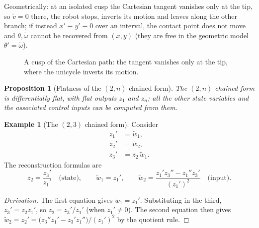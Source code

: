 \documentclass[11pt,a4paper]{article}
\newcommand{\vt}{\tilde v}
\newcommand{\wt}{\tilde\omega}
\newcommand{\wwt}{\tilde w}
\theoremstyle{definition}
\newtheorem{example}[definition]{Example}
\theoremstyle{plain}
\newtheorem{proposition}[definition]{Proposition}
\theoremstyle{remark}
\begin{document}
Geometrically: at an isolated cusp the Cartesian tangent vanishes only at the tip, so $\vt=0$ there, the robot stops, inverts its
motion and leaves along the other branch; if instead $x'\equiv y'\equiv0$ over an interval, the contact point does not move and
$\theta,\wt$ cannot be recovered from $(x,y)$ (they are free in the geometric model $\theta'=\wt$).

\begin{figure}[H]
\centering
{}
\caption{A cusp of the Cartesian path: the tangent vanishes only at the tip, where the unicycle inverts its motion.}
\end{figure}

\begin{proposition}[Flatness of the $(2,n)$ chained form]
The $(2,n)$ chained form is differentially flat, with flat outputs $z_1$ and $z_n$; all the other state variables and the
associated control inputs can be computed from them.
\end{proposition}

\begin{example}[The $(2,3)$ chained form]\label{ex:chain23}
Consider
\begin{align}
z_1'&=\wwt_1,\nonumber\\
z_2'&=\wwt_2,\\
z_3'&=z_2\,\wwt_1.\nonumber
\end{align}
The reconstruction formulas are
\begin{equation}
z_2=\frac{z_3'}{z_1'}\quad\text{(state)},\qquad
\wwt_1=z_1',\qquad
\wwt_2=\frac{z_1'z_3''-z_1''z_3'}{(z_1')^2}\quad\text{(input)}.
\end{equation}
\end{example}
\begin{proof}[Derivation]
The first equation gives $\wwt_1=z_1'$. Substituting in the third, $z_3'=z_2z_1'$, so $z_2=z_3'/z_1'$ (when $z_1'\ne0$).
The second equation then gives $\wwt_2=z_2'=\big(z_3''z_1'-z_3'z_1''\big)/(z_1')^2$ by the quotient rule. \qedhere
\end{proof}
\end{document}
